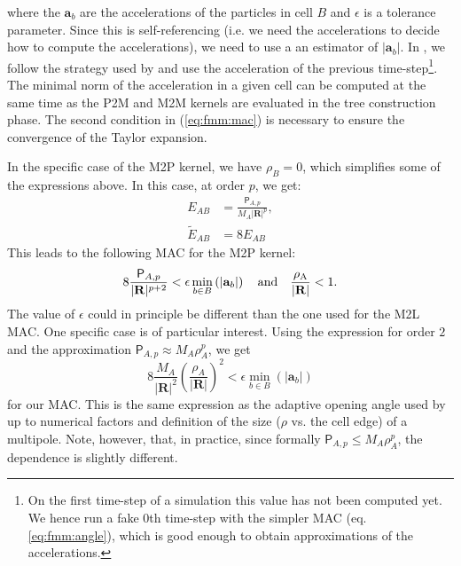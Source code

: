 where the $\mathbf{a}_b$ are the accelerations of the particles in cell $B$
and $\epsilon$ is a tolerance parameter. Since this is self-referencing
(i.e. we need the accelerations to decide how to compute the
accelerations), we need to use a an estimator of $|\mathbf{a}_b|$. In
\swift, we follow the strategy used by \gadget and use the acceleration of
the previous time-step\footnote{On the first time-step of a simulation this
  value has not been computed yet. We hence run a fake 0th time-step with
  the simpler MAC (eq. \ref{eq:fmm:angle}), which is good enough to obtain
  approximations of the accelerations.}. The minimal norm of the
acceleration in a given cell can be computed at the same time as the P2M
and M2M kernels are evaluated in the tree construction phase. The second
condition in (\ref{eq:fmm:mac}) is necessary to ensure the convergence of the
Taylor expansion.

In the specific case of the M2P kernel, we have $\rho_B = 0$, which
simplifies some of the expressions above. In this case, at order $p$, we get:
\begin{align}
  E_{AB} &= \frac{\mathsf{P}_{A,p}}{M_A |\mathbf{R}|^p}, \nonumber \\
  \tilde{E}_{AB} &= 8E_{AB} \nonumber 
\end{align}
This leads to the following MAC for the M2P kernel:
\begin{equation}
  8\frac{\mathsf{P}_{A,p}}{|\mathbf{R}|^{p+2}} < \epsilon \min_{b\in
    B}\left(|\mathbf{a}_b|\right) \quad \rm{and} \quad \frac{\rho_A}
  {|\mathbf{R}|} < 1.
    \label{eq:fmm:mac_m2p}  
\end{equation}
The value of $\epsilon$ could in principle be different than the one
used for the M2L MAC. One specific case is of particular
interest. Using the expression for order $2$ and the approximation
$\mathsf{P}_{A,p} \approx M_A \rho_A^p$, we get
\begin{equation}
  8\frac{M_A}{|\mathbf{R}|^2}\left(\frac{\rho_A}{|\mathbf{R}|}\right)^2
  < \epsilon \min_{b\in B}\left(|\mathbf{a}_b|\right) \nonumber
\end{equation}
for our MAC.  This is the same expression as the adaptive opening
angle used by \gadget \cite[see eq.18 of][]{Springel2005} up to
numerical factors and definition of the size ($\rho$ vs. the cell
edge) of a multipole. Note, however, that, in practice, since formally
$\mathsf{P}_{A,p} \leq M_A \rho_A^p$, the dependence is slightly different.

